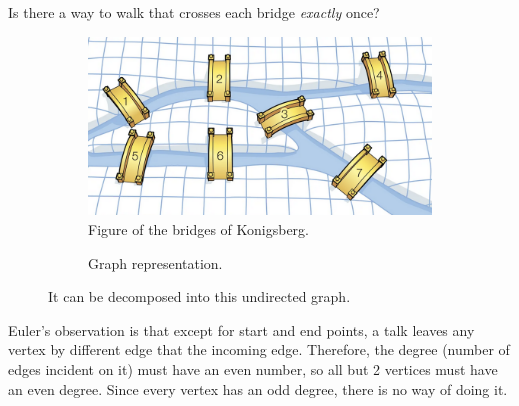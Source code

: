   \begin{example}
    Is there a way to walk that crosses each bridge \textit{exactly} once? 

    \begin{figure}[H]
      \centering
      \begin{subfigure}[b]{0.48\textwidth}
      \centering
        \includegraphics[scale=0.4]{img/bridges.png}
        \caption{Figure of the bridges of Konigsberg.}
        \label{fig:bridges}
      \end{subfigure}
      \hfill 
      \begin{subfigure}[b]{0.48\textwidth}
      \centering
        \caption{Graph representation. }
        \label{fig:graph_bridges}
      \end{subfigure}
      \caption{It can be decomposed into this undirected graph.}
      \label{fig:konigsberg}
    \end{figure}
     
    Euler's observation is that except for start and end points, a talk leaves any vertex by different edge that the incoming edge. Therefore, the degree (number of edges incident on it) must have an even number, so all but 2 vertices must have an even degree. Since every vertex has an odd degree, there is no way of doing it. 
  \end{example}


